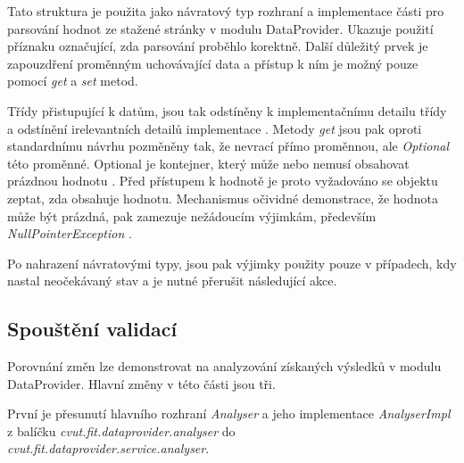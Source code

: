 \documentclass[thesis=B,czech]{FITthesis}[2012/06/26]
\begin{document}
Tato struktura je použita jako návratový typ rozhraní a implementace části pro parsování hodnot 
ze stažené stránky v modulu DataProvider. Ukazuje použití příznaku označující, zda parsování proběhlo korektně. Další důležitý prvek
je zapouzdření proměnným uchovávající data a přístup k ním je možný pouze pomocí \textit{get} a \textit{set} metod.
\par
Třídy přistupující k datům, jsou tak odstíněny k implementačnímu detailu třídy a odstínění irelevantních detailů implementace \cite{encapsulation}.
Metody \textit{get} jsou pak oproti standardnímu návrhu pozměněny tak, že nevrací přímo proměnnou, ale \textit{Optional} této proměnné.
Optional je kontejner, který může nebo nemusí obsahovat prázdnou hodnotu \cite{optional}. Před přístupem k hodnotě je proto vyžadováno se objektu zeptat, zda obsahuje hodnotu. Mechanismus očividné demonstrace, že hodnota může být prázdná, pak zamezuje nežádoucím výjimkám, především \textit{NullPointerException} \cite{nullPointerException}.
\par
Po nahrazení návratovými typy, jsou pak výjimky použity pouze v případech, kdy nastal neočekávaný stav a je nutné přerušit následující akce.

\subsection{Spouštění validací}
Porovnání změn lze demonstrovat na analyzování získaných výsledků v modulu DataProvider. Hlavní změny v této části jsou tři.
\par
První je přesunutí hlavního rozhraní \textit{Analyser} a jeho implementace
\textit{AnalyserImpl} z balíčku \textit{cvut.fit.dataprovider.analyser} 
do  \\
\textit{cvut.fit.dataprovider.service.analyser}. 
\end{document}
